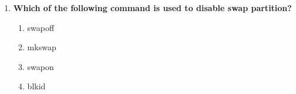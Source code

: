 \begin{flushleft}
\begin{enumerate}
		\item \textbf{Which of the following command is used to disable swap partition?}
		\begin{enumerate}[label=(\alph*)]
			\item swapoff  %
			\item mkswap   
			\item swapon   
			\item blkid
		\end{enumerate}
		\bigskip
		\bigskip
		
	\end{enumerate}
	
	
\end{flushleft}

\newpage

